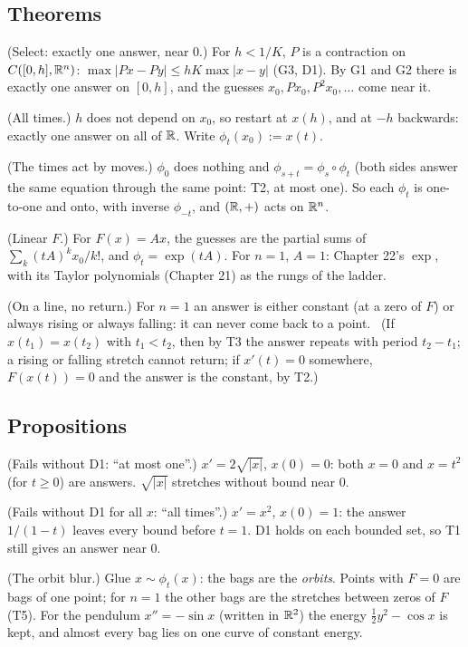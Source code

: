\subsection*{Theorems}

\begin{lines}
\item[\lab{T1}] (Select: exactly one answer, near $0$.) For $h < 1/K$, $P$ is a contraction on $C([0, h], \mathbb{R}^n)$: $\max |Px - Py| \le hK \max |x - y|$ (G3, D1). By G1 and G2 there is exactly one answer on $[0, h]$, and the guesses $x_0, Px_0, P^2x_0, \dots$ come near it.
\item[\lab{T2}] (All times.) $h$ does not depend on $x_0$, so restart at $x(h)$, and at $-h$ backwards: exactly one answer on all of $\mathbb{R}$. Write $\phi_t(x_0) := x(t)$.
\item[\lab{T3}] (The times act by moves.) $\phi_0$ does nothing and $\phi_{s+t} = \phi_s \circ \phi_t$ (both sides answer the same equation through the same point: T2, at most one). So each $\phi_t$ is one-to-one and onto, with inverse $\phi_{-t}$, and $(\mathbb{R}, +)$ acts on $\mathbb{R}^n$.
\item[\lab{T4}] (Linear $F$.) For $F(x) = Ax$, the guesses are the partial sums of $\sum_k (tA)^k x_0 / k!$, and $\phi_t = \exp(tA)$. For $n = 1$, $A = 1$: Chapter 22's $\exp$, with its Taylor polynomials (Chapter 21) as the rungs of the ladder.
\item[\lab{T5}] (On a line, no return.) For $n = 1$ an answer is either constant (at a zero of $F$) or always rising or always falling: it can never come back to a point. \ (If $x(t_1) = x(t_2)$ with $t_1 < t_2$, then by T3 the answer repeats with period $t_2 - t_1$; a rising or falling stretch cannot return; if $x'(t) = 0$ somewhere, $F(x(t)) = 0$ and the answer is the constant, by T2.)
\end{lines}

\subsection*{Propositions}

\begin{lines}
\item[\lab{P1}] (Fails without D1: ``at most one''.) $x' = 2\sqrt{|x|}$, $x(0) = 0$: both $x = 0$ and $x = t^2$ (for $t \ge 0$) are answers. $\sqrt{|x|}$ stretches without bound near $0$.
\item[\lab{P2}] (Fails without D1 for all $x$: ``all times''.) $x' = x^2$, $x(0) = 1$: the answer $1/(1 - t)$ leaves every bound before $t = 1$. D1 holds on each bounded set, so T1 still gives an answer near $0$.
\item[\lab{P3}] (The orbit blur.) Glue $x \sim \phi_t(x)$: the bags are the \emph{orbits}. Points with $F = 0$ are bags of one point; for $n = 1$ the other bags are the stretches between zeros of $F$ (T5). For the pendulum $x'' = -\sin x$ (written in $\mathbb{R}^2$) the energy $\tfrac12 y^2 - \cos x$ is kept, and almost every bag lies on one curve of constant energy.
\end{lines}

